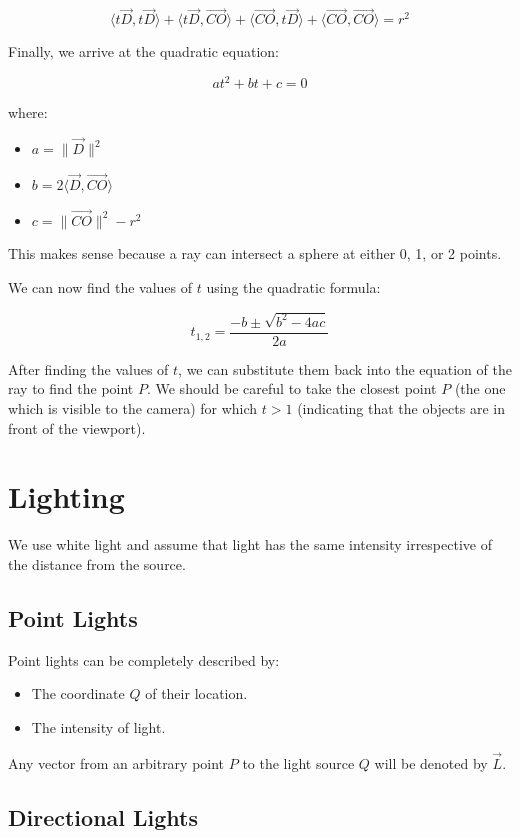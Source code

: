 \documentclass[conference]{IEEEtran}
\begin{document}
$$\langle t \vec{D}, t \vec{D} \rangle + \langle t \vec{D}, \vec{CO} \rangle + \langle \vec{CO}, t \vec{D} \rangle + \langle \vec{CO}, \vec{CO} \rangle = r^2$$

Finally, we arrive at the quadratic equation:

$$at^2 + bt + c = 0$$

where:
\begin{itemize}
    \item $a = \| \vec{D} \|^2$
    \item $b = 2 \langle \vec{D}, \vec{CO} \rangle$
    \item $c = \| \vec{CO} \|^2 - r^2$
\end{itemize}

This makes sense because a ray can intersect a sphere at either 0, 1, or 2 points.

We can now find the values of $t$ using the quadratic formula:

$$t_{1,2} = \frac{-b \pm \sqrt{b^2 - 4ac}}{2a}$$

After finding the values of $t$, we can substitute them back into the equation of the ray to find the point $P$. We should be careful to take the closest point $P$ (the one which is visible to the camera) for which $t > 1$ (indicating that the objects are in front of the viewport).

\section{Lighting}

We use white light and assume that light has the same intensity irrespective of the distance from the source.

\subsection{Point Lights}

Point lights can be completely described by:
\begin{itemize}
    \item The coordinate $Q$ of their location.
    \item The intensity of light.
\end{itemize}

Any vector from an arbitrary point $P$ to the light source $Q$ will be denoted by $\vec{L}$.

\subsection{Directional Lights}
\end{document}
